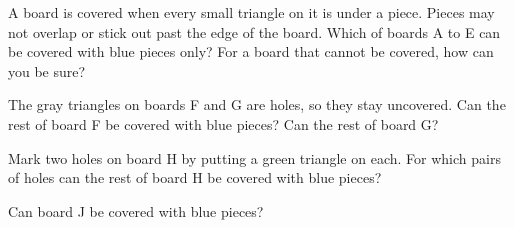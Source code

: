 \documentclass{article}
\begin{document}
\fontsize{14}{19.5}\selectfont

A board is covered when every small triangle on it is under a piece.
Pieces may not overlap or stick out past the edge of the board.
Which of boards A to E can be covered with blue pieces only?
For a board that cannot be covered, how can you be sure?

\vspace{0.1in}
\begin{center}

\vspace{0.4in}

\vspace{0.4in}
\end{center}

\newpage
\vspace*{0.2in}
\begin{center}

\vspace{0.7in}
\end{center}

\newpage
The gray triangles on boards F and G are holes, so they stay uncovered.
Can the rest of board F be covered with blue pieces?
Can the rest of board G?

\vspace{0.2in}
\begin{center}

\vspace{0.45in}
\end{center}

\newpage
Mark two holes on board H by putting a green triangle on each.
For which pairs of holes can the rest of board H be covered with blue pieces?

\vspace{0.1in}
\begin{center}
\end{center}

\vspace{0.35in}
Can board J be covered with blue pieces?

\vspace{0.25in}
\begin{center}
\end{center}
\end{document}
